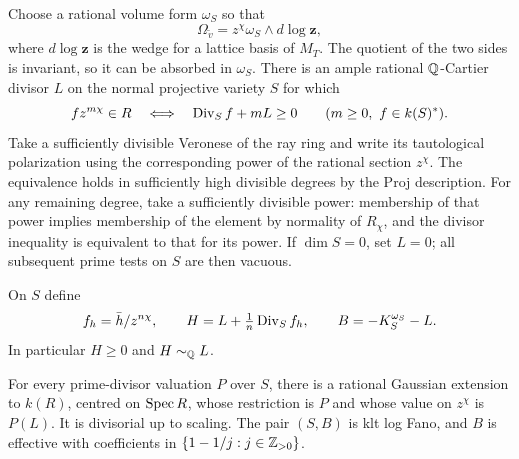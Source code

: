 Choose a rational volume form \(\omega_S\) so that
\[
               \Omega_{\tilde v}
                    =z^\chi\omega_S\wedge d\log\mathbf z,
\]
where \(d\log\mathbf z\) is the wedge for a lattice basis of \(M_T\).
The quotient of the two sides is invariant, so it can be absorbed in
\(\omega_S\). There is an ample rational \(\mathbb Q\)-Cartier divisor \(L\)
on the normal projective variety \(S\) for which
\begin{equation}
 fz^{m\chi}\in R
       \quad\Longleftrightarrow\quad \operatorname{Div}_S f+mL\geq0
             \qquad(m\geq0,\ f\in k(S)^*).
 \label{eq:A9}
\end{equation}
Take a sufficiently divisible Veronese of the ray ring and write its
tautological polarization using the corresponding power of the rational
section \(z^\chi\). The equivalence holds in sufficiently high divisible
degrees by the Proj description. For any remaining degree, take a
sufficiently divisible power: membership of that power implies
membership of the element by normality of \(R_\chi\), and the divisor
inequality is equivalent to that for its power. If \(\dim S=0\), set
\(L=0\); all subsequent prime tests on \(S\) are then vacuous.

On \(S\) define
\[
 f_h=\bar h/z^{n\chi},\qquad
 H=L+\tfrac1n\operatorname{Div}_S f_h,\qquad
 B=-K_S^{\omega_S}-L.
\]
In particular \(H\geq0\) and \(H\sim_{\mathbb Q}L\).

\begin{lemma}\label{a:gauss-lifts}
For every prime-divisor valuation \(P\) over \(S\), there is a rational
Gaussian extension to \(k(R)\), centred on \(\operatorname{Spec} R\), whose restriction
is \(P\) and whose value on \(z^\chi\) is \(P(L)\). It is divisorial
up to scaling. The pair \((S,B)\) is klt log Fano, and \(B\) is effective
with coefficients in \(\{1-1/j:j\in\mathbb Z_{>0}\}\).
\end{lemma}

